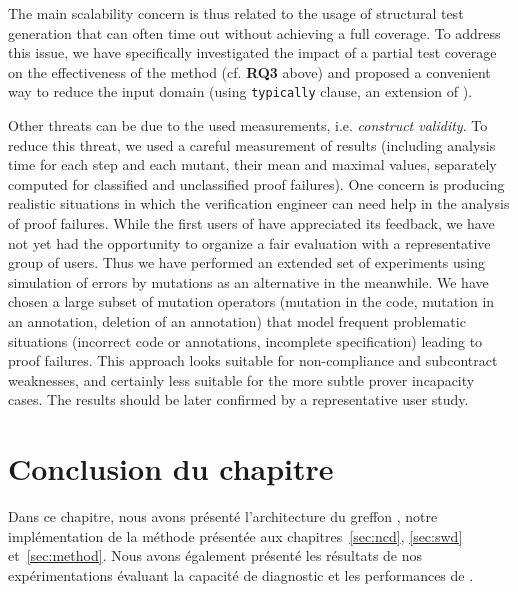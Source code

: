 The main scalability concern is thus related to the usage of structural test generation 
that can often time out without achieving a full coverage.
To address this issue, we have specifically investigated the impact of a partial test coverage
on the effectiveness of the method (cf. \textbf{RQ3} above) and proposed
a convenient way to reduce the input domain (using \lstinline{typically} clause, 
an extension of \acsl).

Other threats can be due to the used measurements, i.e. \textit{construct validity}.
To reduce this threat, we used a careful measurement of 
results (including analysis time for each step and 
each mutant, their mean and maximal values, 
separately computed for classified and unclassified proof failures).
One concern is producing realistic situations in which 
the verification engineer can need help in the analysis of proof failures.
While the first users of \stady have appreciated its feedback, %
we have not yet had the opportunity to organize a fair evaluation with a 
representative group of users. 
Thus we have performed an extended set of experiments using simulation of 
errors by mutations as an alternative in the meanwhile. 
We have chosen a large subset of mutation operators (mutation in the code,
mutation in an annotation, deletion of an annotation) that model 
frequent problematic situations 
(incorrect code or annotations, incomplete specification)
leading to proof failures.
This approach looks suitable for non-compliance and subcontract weaknesses, and
certainly less suitable for the more subtle prover incapacity cases.
The results should be later confirmed by a representative user study.


\section*{Conclusion du chapitre}


Dans ce chapitre, nous avons présenté l'architecture du greffon \stady, notre
implémentation de la méthode présentée aux chapitres~\ref{sec:ncd},
\ref{sec:swd} et~\ref{sec:method}.
Nous avons également présenté les résultats de nos expérimentations évaluant
la capacité de diagnostic et les performances de \stady.
